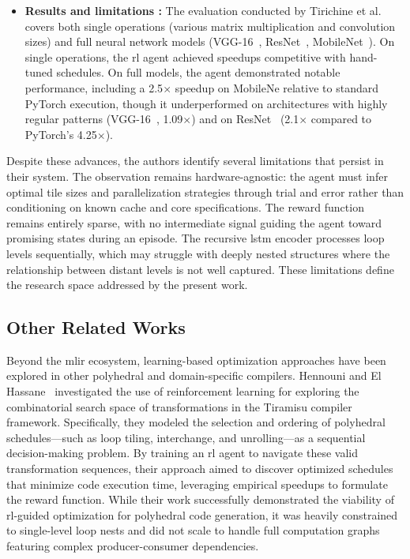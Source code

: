 \begin{itemize}
\item \textbf{Results and limitations :} The evaluation conducted by Tirichine et al. covers both single operations (various matrix multiplication and convolution sizes) and full neural network models (VGG-16~\cite{simonyan2015vgg}, ResNet~\cite{he2016resnet}, MobileNet~\cite{howard2019mobilenetv3}). On single operations, the \gls{rl} agent achieved speedups competitive with hand-tuned schedules. On full models, the agent demonstrated notable performance, including a 2.5$\times$ speedup on MobileNe relative to standard PyTorch execution, though it underperformed on architectures with highly regular patterns (VGG-16~\cite{simonyan2015vgg}, 1.09$\times$) and on ResNet~\cite{he2016resnet} (2.1$\times$ compared to PyTorch's 4.25$\times$).
\end{itemize}
Despite these advances, the authors identify several limitations that persist in their system. The observation remains hardware-agnostic: the agent must infer optimal tile sizes and parallelization strategies through trial and error rather than conditioning on known cache and core specifications. The reward function remains entirely sparse, with no intermediate signal guiding the agent toward promising states during an episode. The recursive \gls{lstm} encoder processes loop levels sequentially, which may struggle with deeply nested structures where the relationship between distant levels is not well captured. These limitations define the research space addressed by the present work.

\subsection{Other Related Works}

Beyond the \gls{mlir} ecosystem, learning-based optimization approaches have been explored in other polyhedral and domain-specific compilers. Hennouni and El Hassane~\cite{henouni2022utilisation} investigated the use of reinforcement learning for exploring the combinatorial search space of transformations in the Tiramisu compiler framework. Specifically, they modeled the selection and ordering of polyhedral schedules—such as loop tiling, interchange, and unrolling—as a sequential decision-making problem. By training an \gls{rl} agent to navigate these valid transformation sequences, their approach aimed to discover optimized schedules that minimize code execution time, leveraging empirical speedups to formulate the reward function. While their work successfully demonstrated the viability of \gls{rl}-guided optimization for polyhedral code generation, it was heavily constrained to single-level loop nests and did not scale to handle full computation graphs featuring complex producer-consumer dependencies.


